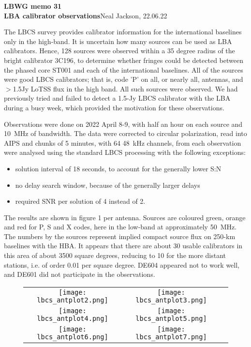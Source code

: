 \documentclass[12pt]{article}
\newcommand{\memohead}[3]{\clearpage\begin{centering}\mbox{}\hrulefill \vskip 50mm \mbox{}{\Huge \bf LBWG memo #1}\\ \mbox{}\vskip 40mm {\Huge \bf #2}\mbox{}\vskip 40mm{\Large #3}\\\end{centering}\vfill\hrulefill\clearpage}
\begin{document}
\memohead{31}{LBA calibrator observations}{Neal Jackson, 22.06.22}

The LBCS survey provides calibrator information for the international baselines only in the high-band. It is uncertain how many sources can be used as LBA calibrators. Hence, 128 sources were observed within a 35 degree radius of the bright calibrator 3C196, to determine whether fringes could be detected between the phased core ST001 and each of the international baselines. All of the sources were good LBCS calibrators; that is, code 'P' on all, or nearly all, antennas, and $>$1.5Jy LoTSS flux in the high band. All such sources were observed. We had previously tried and failed to detect a 1.5-Jy LBCS calibrator with the LBA during a busy week, which provided the motivation for these observations.

Observations were done on 2022 April 8-9, with half an hour on each source and 10~MHz of bandwidth. The data were corrected to circular polarization, read into AIPS and chunks of 5 minutes, with 64 48~kHz channels, from each observation were analysed using the standard LBCS processing with the following exceptions:

\begin{itemize}
\item solution interval of 18 seconds, to account for the generally lower S:N
\item no delay search window, because of the generally larger delays
  \item required SNR per solution of 4 instead of 2.
\end{itemize}

The results are shown in figure 1 per antenna. Sources are coloured green, orange and red for P, S and X codes, here in the low-band at approximately 50~MHz. The numbers by the sources represent implied compact source flux on 250-km baselines with the HBA. It appears that there are about 30 usable calibrators in this area of about 3500 square degrees, reducing to 10 for the more distant stations, i.e. of order 0.01 per square degree. DE604 appeared not to work well, and DE601 did not participate in the observations.

\begin{figure}
  \begin{tabular}{ccc}
    \texttt{[image: lbcs\_antplot2.png]}&
    \texttt{[image: lbcs\_antplot3.png]}\\
    \texttt{[image: lbcs\_antplot4.png]}&
    \texttt{[image: lbcs\_antplot5.png]}\\
    \texttt{[image: lbcs\_antplot6.png]}&
    \texttt{[image: lbcs\_antplot7.png]}\\
  \end{tabular}
\end{figure}
\end{document}
